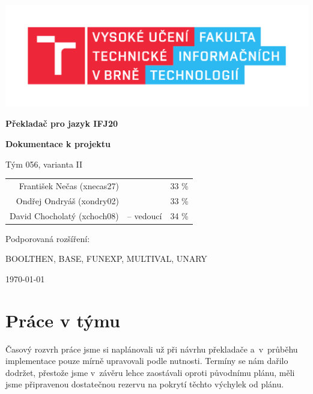 \documentclass[11pt]{article}
\begin{document}
\begin{titlepage}
	\centering
	\includegraphics[width=\textwidth]{img/FIT_barevne_CMYK_CZ.pdf}
	\par
	
	{\huge\bfseries Překladač pro jazyk IFJ20 \par}
	{\Large \textbf{Dokumentace k projektu} \par}
	{\Large Tým 056, varianta II \par}
	\vspace{2cm}
	
	\Large{
	\begin{tabular}{r l | r}
	    František Nečas (xnecas27) & & 33 \% \\
	    Ondřej Ondryáš (xondry02) & & 33 \% \\
	    David Chocholatý (xchoch08) & – vedoucí & 34 \% \\
	\end{tabular}
	}
	
	\vspace{2cm}
	
	{\Large Podporovaná rozšíření: \par}
	{\large BOOLTHEN, BASE, FUNEXP, MULTIVAL, UNARY \par}
    

	{\large \today\par}
\end{titlepage}

\tableofcontents
\newpage

\section{Práce v týmu}

Časový rozvrh práce jsme si naplánovali už při návrhu překladače a~v~průběhu implementace pouze mírně upravovali podle nutnosti. Termíny se nám dařilo dodržet, přestože jsme v~závěru lehce zaostávali oproti původnímu plánu, měli jsme připravenou dostatečnou rezervu na pokrytí těchto výchylek od plánu.
\end{document}
